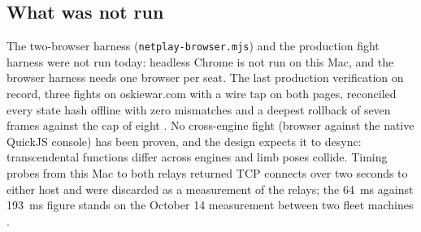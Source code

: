 \documentclass[10pt,letterpaper,twocolumn]{article}
\newcommand{\code}[1]{\texttt{\nolinkurl{#1}}}
\begin{document}
\subsection{What was not run}
The two-browser harness (\code{netplay-browser.mjs}) and the production fight harness were not run today: headless Chrome is not run on this Mac, and the browser harness needs one browser per seat. The last production verification on record, three fights on oskiewar.com with a wire tap on both pages, reconciled every state hash offline with zero mismatches and a deepest rollback of seven frames against the cap of eight \citep{multiplayer}. No cross-engine fight (browser against the native QuickJS console) has been proven, and the design expects it to desync: transcendental functions differ across engines and limb poses collide. Timing probes from this Mac to both relays returned TCP connects over two seconds to either host and were discarded as a measurement of the relays; the 64~ms against 193~ms figure stands on the October 14 measurement between two fleet machines \citep{westcoast}.
\end{document}
